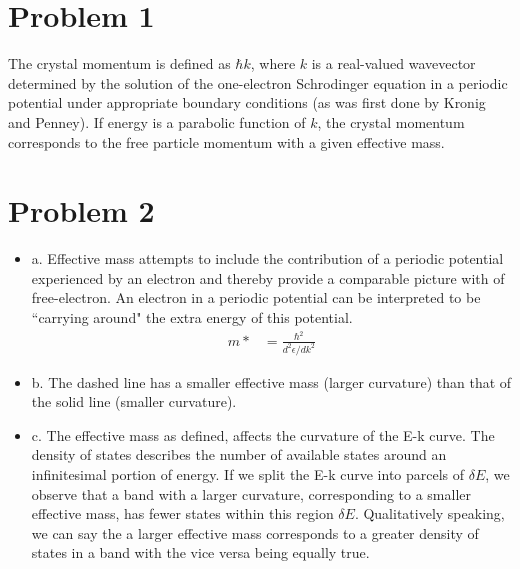 \documentclass{article}
\numberwithin{equation}{section}
\begin{document}
\section*{Problem 1}
The crystal momentum is defined as $\hbar k$, where $k$ is a real-valued wavevector determined by the solution of the one-electron Schrodinger equation in a periodic potential under appropriate boundary conditions (as was first done by Kronig and Penney). If energy is a parabolic function of $k$, the crystal momentum corresponds to the free particle momentum with a given effective mass.

\section*{Problem 2}
\begin{itemize}
\item a. Effective mass attempts to include the contribution of a periodic potential experienced by an electron and thereby provide a comparable picture with of free-electron. An electron in a periodic potential can be interpreted to be ``carrying around" the extra energy of this potential.
\begin{align*}
	m* &= \frac{\hbar^2}{d^2\epsilon/dk^2}
\end{align*}  
\item b. The dashed line has a smaller effective mass (larger curvature) than that of the solid line (smaller curvature). 
\item c. The effective mass as defined, affects the curvature of the E-k curve. The density of states describes the number of available states around an infinitesimal portion of energy. If we split the E-k curve into parcels of $\delta E$, we observe that a band with a larger curvature, corresponding to a smaller effective mass, has fewer states within this region $\delta E$. Qualitatively speaking, we can say the a larger effective mass corresponds to a greater density of states in a band with the vice versa being equally true.
\end{itemize}
\end{document}
